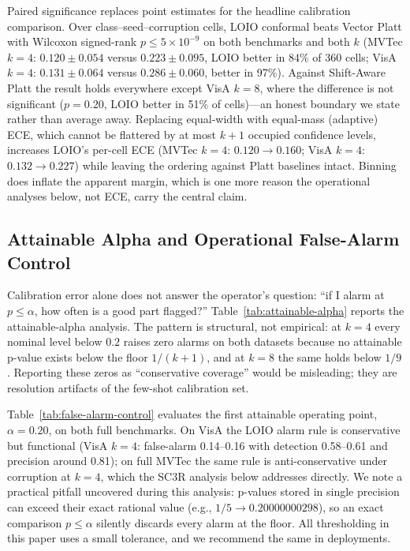 Paired significance replaces point estimates for the headline calibration comparison. Over class--seed--corruption cells, LOIO conformal beats Vector Platt with Wilcoxon signed-rank $p\le5\times10^{-9}$ on both benchmarks and both $k$ (MVTec $k{=}4$: $0.120\pm0.054$ versus $0.223\pm0.095$, LOIO better in 84\% of 360 cells; VisA $k{=}4$: $0.131\pm0.064$ versus $0.286\pm0.060$, better in 97\%). Against Shift-Aware Platt the result holds everywhere except VisA $k{=}8$, where the difference is not significant ($p{=}0.20$, LOIO better in 51\% of cells)---an honest boundary we state rather than average away. Replacing equal-width with equal-mass (adaptive) ECE, which cannot be flattered by at most $k{+}1$ occupied confidence levels, increases LOIO's per-cell ECE (MVTec $k{=}4$: $0.120\to0.160$; VisA $k{=}4$: $0.132\to0.227$) while leaving the ordering against Platt baselines intact. Binning does inflate the apparent margin, which is one more reason the operational analyses below, not ECE, carry the central claim.

\subsection{Attainable Alpha and Operational False-Alarm Control}

Calibration error alone does not answer the operator's question: ``if I alarm at $p\le\alpha$, how often is a good part flagged?'' Table~\ref{tab:attainable-alpha} reports the attainable-alpha analysis. The pattern is structural, not empirical: at $k{=}4$ every nominal level below $0.2$ raises zero alarms on both datasets because no attainable p-value exists below the floor $1/(k{+}1)$, and at $k{=}8$ the same holds below $1/9$. Reporting these zeros as ``conservative coverage'' would be misleading; they are resolution artifacts of the few-shot calibration set.


Table~\ref{tab:false-alarm-control} evaluates the first attainable operating point, $\alpha{=}0.20$, on both full benchmarks. On VisA the LOIO alarm rule is conservative but functional (VisA $k{=}4$: false-alarm 0.14--0.16 with detection 0.58--0.61 and precision around 0.81); on full MVTec the same rule is anti-conservative under corruption at $k{=}4$, which the SC3R analysis below addresses directly. We note a practical pitfall uncovered during this analysis: p-values stored in single precision can exceed their exact rational value (e.g., $1/5\rightarrow0.20000000298$), so an exact comparison $p\le\alpha$ silently discards every alarm at the floor. All thresholding in this paper uses a small tolerance, and we recommend the same in deployments.

